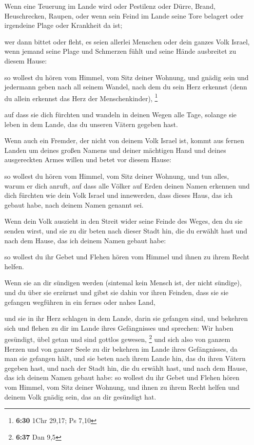  Wenn eine Teuerung im Lande wird oder Pestilenz oder
Dürre, Brand, Heuschrecken, Raupen, oder wenn sein Feind im Lande seine
Tore belagert oder irgendeine Plage oder Krankheit da ist;

 wer dann bittet oder fleht, es seien allerlei Menschen
oder dein ganzes Volk Israel, wenn jemand seine Plage und Schmerzen
fühlt und seine Hände ausbreitet zu diesem Hause:

 so wollest du hören vom Himmel, vom Sitz deiner Wohnung,
und gnädig sein und jedermann geben nach all seinem Wandel, nach dem du
sein Herz erkennst (denn du allein erkennst das Herz der
Menschenkinder), \footnote{\textbf{6:30} 1Chr 29,17; Ps 7,10}

 auf dass sie dich fürchten und wandeln in deinen Wegen
alle Tage, solange sie leben in dem Lande, das du unseren Vätern gegeben
hast.

 Wenn auch ein Fremder, der nicht von deinem Volk Israel
ist, kommt aus fernen Landen um deines großen Namens und deiner
mächtigen Hand und deines ausgereckten Armes willen und betet vor diesem
Hause:

 so wollest du hören vom Himmel, vom Sitz deiner Wohnung,
und tun alles, warum er dich anruft, auf dass alle Völker auf Erden
deinen Namen erkennen und dich fürchten wie dein Volk Israel und
innewerden, dass dieses Haus, das ich gebaut habe, nach deinem Namen
genannt sei.

 Wenn dein Volk auszieht in den Streit wider seine Feinde
des Weges, den du sie senden wirst, und sie zu dir beten nach dieser
Stadt hin, die du erwählt hast und nach dem Hause, das ich deinem Namen
gebaut habe:

 so wollest du ihr Gebet und Flehen hören vom Himmel und
ihnen zu ihrem Recht helfen.

 Wenn sie an dir sündigen werden (sintemal kein Mensch
ist, der nicht sündige), und du über sie erzürnst und gibst sie dahin
vor ihren Feinden, dass sie sie gefangen wegführen in ein fernes oder
nahes Land,

 und sie in ihr Herz schlagen in dem Lande, darin sie
gefangen sind, und bekehren sich und flehen zu dir im Lande ihres
Gefängnisses und sprechen: Wir haben gesündigt, übel getan und sind
gottlos gewesen, \footnote{\textbf{6:37} Dan 9,5}  und
sich also von ganzem Herzen und von ganzer Seele zu dir bekehren im
Lande ihres Gefängnisses, da man sie gefangen hält, und sie beten nach
ihrem Lande hin, das du ihren Vätern gegeben hast, und nach der Stadt
hin, die du erwählt hast, und nach dem Hause, das ich deinem Namen
gebaut habe:  so wollest du ihr Gebet und Flehen hören
vom Himmel, vom Sitz deiner Wohnung, und ihnen zu ihrem Recht helfen und
deinem Volk gnädig sein, das an dir gesündigt hat.

